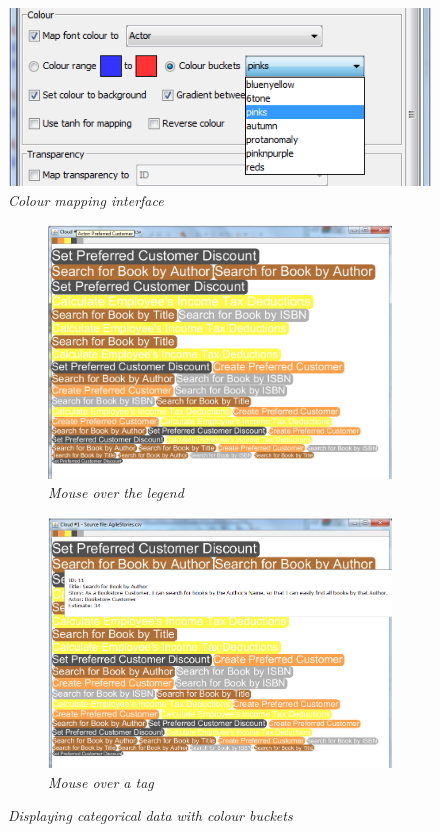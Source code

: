 \begin{figure}[!htb]
  	\centering
   	\includegraphics[scale=0.75]{colourinterface.png}
  	\caption{\textit{Colour mapping interface}}
	\label{fig:colourinterface}
\end{figure}

\begin{figure}[!htb]
\begin{subfigure}{.5\textwidth}
	\centering
	\includegraphics[scale=0.20]{colourbuckets1.png}
	\caption{\textit{Mouse over the legend}}
\end{subfigure}%
\begin{subfigure}{.5\textwidth}
  \centering
  \includegraphics[scale=0.20]{colourbuckets2.png}
  \caption{\textit{Mouse over a tag}}
\end{subfigure}
  \caption{\textit{Displaying categorical data with colour buckets}}
  \label{fig:colourbuckets}
\end{figure}

